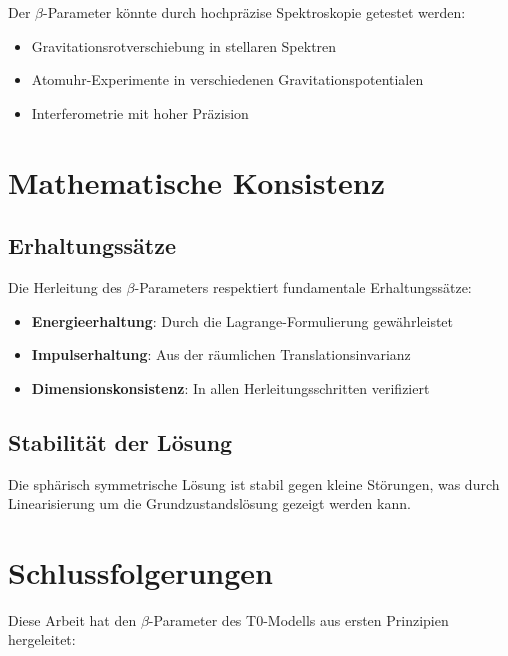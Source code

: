 \documentclass[12pt,a4paper]{article}
\begin{document}
	Der $\beta$-Parameter könnte durch hochpräzise Spektroskopie getestet werden:
	\begin{itemize}
		\item Gravitationsrotverschiebung in stellaren Spektren
		\item Atomuhr-Experimente in verschiedenen Gravitationspotentialen
		\item Interferometrie mit hoher Präzision
	\end{itemize}
	
	\section{Mathematische Konsistenz}
	\label{sec:mathematical_consistency}
	
	\subsection{Erhaltungssätze}
	\label{subsec:conservation_laws}
	
	Die Herleitung des $\beta$-Parameters respektiert fundamentale Erhaltungssätze:
	\begin{itemize}
		\item \textbf{Energieerhaltung}: Durch die Lagrange-Formulierung gewährleistet
		\item \textbf{Impulserhaltung}: Aus der räumlichen Translationsinvarianz
		\item \textbf{Dimensionskonsistenz}: In allen Herleitungsschritten verifiziert
	\end{itemize}
	
	\subsection{Stabilität der Lösung}
	\label{subsec:solution_stability}
	
	Die sphärisch symmetrische Lösung ist stabil gegen kleine Störungen, was durch Linearisierung um die Grundzustandslösung gezeigt werden kann.
	
	\section{Schlussfolgerungen}
	\label{sec:conclusions}
	
	Diese Arbeit hat den $\beta$-Parameter des T0-Modells aus ersten Prinzipien hergeleitet:
	
\end{document}
